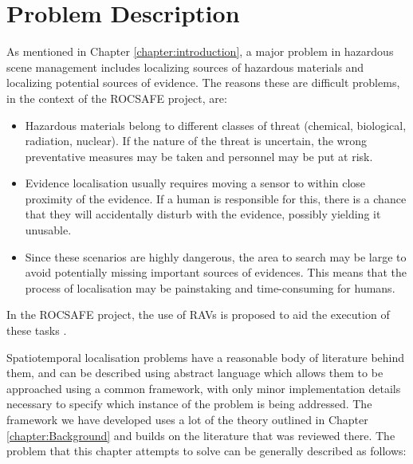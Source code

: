 \section{Problem Description}\label{sec:TLocalisationProbDescription}
As mentioned in Chapter \ref{chapter:introduction}, a major problem in hazardous scene management includes localizing sources of hazardous materials and localizing potential sources of evidence. The reasons these are difficult problems, in the context of the ROCSAFE project, are:
\begin{itemize}
    \item Hazardous materials belong to different classes of threat (chemical, biological, radiation, nuclear). If the nature of the threat is uncertain, the wrong preventative measures may be taken and personnel may be put at risk. 
    \item Evidence localisation usually requires moving a sensor to within close proximity of the evidence. If a human is responsible for this, there is a chance that they will accidentally disturb with the evidence, possibly yielding it unusable.
    \item Since these scenarios are highly dangerous, the area to search may be large to avoid potentially missing important sources of evidences. This means that the process of localisation may be painstaking and time-consuming for humans.
\end{itemize}
In the ROCSAFE project, the use of RAVs is proposed to aid the execution of these tasks \cite{Bagherzadeh2017ROCSAFE:Incidents}.%

  



Spatiotemporal localisation problems have a reasonable body of literature behind them, and can be described using abstract language which allows them to be approached using a common framework, with only minor implementation details necessary to specify which instance of the problem is being addressed. The framework we have developed uses a lot of the theory outlined in Chapter \ref{chapter:Background} and builds on the literature that was reviewed there. The problem that this chapter attempts to solve can be generally described as follows:\\


